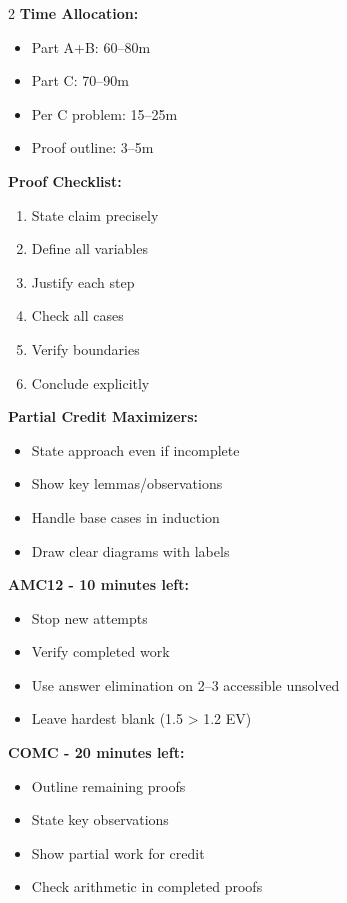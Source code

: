 \documentclass{article}
\begin{document}
\begin{tcolorbox}[colback=standardpurple!5, colframe=standardpurple!75!black, title={\textbf{COMC Part C Quick Reference}}, fonttitle=\bfseries]
\begin{multicols}{2}
\textbf{Time Allocation:}
\begin{itemize}[nosep, leftmargin=*]
\item Part A+B: 60--80m
\item Part C: 70--90m
\item Per C problem: 15--25m
\item Proof outline: 3--5m
\end{itemize}

\textbf{Proof Checklist:}
\begin{enumerate}[nosep, leftmargin=*]
\item State claim precisely
\item Define all variables
\item Justify each step
\item Check all cases
\item Verify boundaries
\item Conclude explicitly
\end{enumerate}
\end{multicols}

\textbf{Partial Credit Maximizers:}
\begin{itemize}[nosep]
\item State approach even if incomplete
\item Show key lemmas/observations
\item Handle base cases in induction
\item Draw clear diagrams with labels
\end{itemize}
\end{tcolorbox}

\begin{tcolorbox}[colback=warningred!5, colframe=warningred!75!black, title={\textbf{Emergency Protocols}}, fonttitle=\bfseries]
\textbf{AMC12 - 10 minutes left:}
\begin{itemize}[nosep]
\item Stop new attempts
\item Verify completed work
\item Use answer elimination on 2--3 accessible unsolved
\item Leave hardest blank (1.5 > 1.2 EV)
\end{itemize}

\textbf{COMC - 20 minutes left:}
\begin{itemize}[nosep]
\item Outline remaining proofs
\item State key observations
\item Show partial work for credit
\item Check arithmetic in completed proofs
\end{itemize}
\end{tcolorbox}
\end{document}
